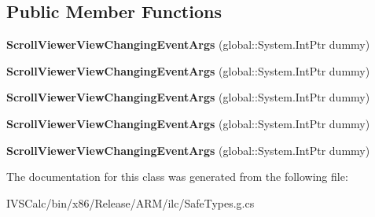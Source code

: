 \subsection*{Public Member Functions}
\begin{DoxyCompactItemize}
\item 
\mbox{\label{class_windows_1_1_u_i_1_1_xaml_1_1_controls_1_1_scroll_viewer_view_changing_event_args_a0e06769334f948a6e4e666daf2d66316}} 
{\bfseries Scroll\+Viewer\+View\+Changing\+Event\+Args} (global\+::\+System.\+Int\+Ptr dummy)
\item 
\mbox{\label{class_windows_1_1_u_i_1_1_xaml_1_1_controls_1_1_scroll_viewer_view_changing_event_args_a0e06769334f948a6e4e666daf2d66316}} 
{\bfseries Scroll\+Viewer\+View\+Changing\+Event\+Args} (global\+::\+System.\+Int\+Ptr dummy)
\item 
\mbox{\label{class_windows_1_1_u_i_1_1_xaml_1_1_controls_1_1_scroll_viewer_view_changing_event_args_a0e06769334f948a6e4e666daf2d66316}} 
{\bfseries Scroll\+Viewer\+View\+Changing\+Event\+Args} (global\+::\+System.\+Int\+Ptr dummy)
\item 
\mbox{\label{class_windows_1_1_u_i_1_1_xaml_1_1_controls_1_1_scroll_viewer_view_changing_event_args_a0e06769334f948a6e4e666daf2d66316}} 
{\bfseries Scroll\+Viewer\+View\+Changing\+Event\+Args} (global\+::\+System.\+Int\+Ptr dummy)
\item 
\mbox{\label{class_windows_1_1_u_i_1_1_xaml_1_1_controls_1_1_scroll_viewer_view_changing_event_args_a0e06769334f948a6e4e666daf2d66316}} 
{\bfseries Scroll\+Viewer\+View\+Changing\+Event\+Args} (global\+::\+System.\+Int\+Ptr dummy)
\end{DoxyCompactItemize}


The documentation for this class was generated from the following file\+:\begin{DoxyCompactItemize}
\item 
I\+V\+S\+Calc/bin/x86/\+Release/\+A\+R\+M/ilc/Safe\+Types.\+g.\+cs\end{DoxyCompactItemize}
